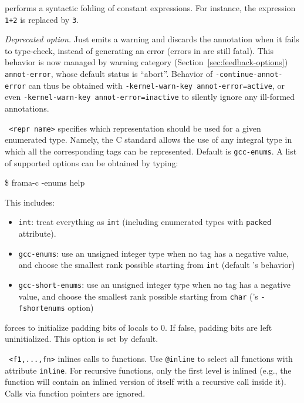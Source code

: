 \begin{description}
\item {} performs a syntactic folding of
constant expressions. For instance,
the expression \texttt{1+2} is replaced by \texttt{3}.

\item {} \emph{Deprecated option.}
  Just emits a warning and discards the annotation when it fails to type-check,
  instead of generating an error (errors in \C are still fatal). This behavior
  is now managed by warning category (Section~\ref{sec:feedback-options})
\texttt{annot-error}, whose default status is ``abort''. Behavior of
\texttt{-continue-annot-error} can thus be obtained with
\texttt{-kernel-warn-key annot-error=active}, or even
\texttt{-kernel-warn-key annot-error=inactive} to silently ignore any ill-formed
annotations.

\item \texttt{ <repr name>} specifies which representation
should be used for a given enumerated type. Namely, the C standard allows the use
of any integral type in which all the corresponding tags can be represented.
Default is \texttt{gcc-enums}. A list of supported
options can be obtained by typing:
\begin{shell}
\$ frama-c -enums help
\end{shell}
This includes:
\begin{itemize}
\item \texttt{int}: treat everything as \texttt{int} (including enumerated types
with \texttt{packed} attribute).
\item \texttt{gcc-enums}: use an unsigned integer type when no tag has a
negative value, and choose the smallest rank possible starting from \texttt{int}
(default \gcc's behavior)
\item \texttt{gcc-short-enums}: use an unsigned integer type when no tag has
a negative value, and choose the smallest rank possible starting from
\texttt{char} (\gcc's \texttt{-fshortenums} option)
\end{itemize}

\item {} forces to initialize padding
  bits of locals to 0. If false, padding bits are left uninitialized. This
  option is set by default.

\item \texttt{ <f1,...,fn>} inlines calls to
  functions. Use \texttt{@inline} to select all functions with attribute
  \texttt{inline}.
  For recursive functions, only the first level
  is inlined (e.g., the function will contain an inlined version of itself with
  a recursive call inside it). Calls via function pointers are ignored.


\end{description}
